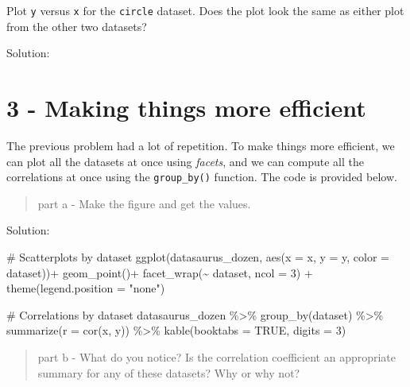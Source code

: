 \documentclass[
  letterpaper,
  DIV=11,
  numbers=noendperiod]{scrartcl}
\newenvironment{Shaded}{\begin{snugshade}}{\end{snugshade}}
\newcommand{\AttributeTok}[1]{\textcolor[rgb]{0.40,0.45,0.13}{#1}}
\newcommand{\CommentTok}[1]{\textcolor[rgb]{0.37,0.37,0.37}{#1}}
\newcommand{\ConstantTok}[1]{\textcolor[rgb]{0.56,0.35,0.01}{#1}}
\newcommand{\DecValTok}[1]{\textcolor[rgb]{0.68,0.00,0.00}{#1}}
\newcommand{\FunctionTok}[1]{\textcolor[rgb]{0.28,0.35,0.67}{#1}}
\newcommand{\NormalTok}[1]{\textcolor[rgb]{0.00,0.23,0.31}{#1}}
\newcommand{\SpecialCharTok}[1]{\textcolor[rgb]{0.37,0.37,0.37}{#1}}
\newcommand{\StringTok}[1]{\textcolor[rgb]{0.13,0.47,0.30}{#1}}
\begin{document}
Plot \texttt{y} versus \texttt{x} for the \texttt{circle} dataset. Does
the plot look the same as either plot from the other two datasets?

Solution:

\newpage

\hypertarget{making-things-more-efficient}{%
\section{3 - Making things more
efficient}\label{making-things-more-efficient}}

The previous problem had a lot of repetition. To make things more
efficient, we can plot all the datasets at once using \emph{facets}, and
we can compute all the correlations at once using the
\texttt{group\_by()} function. The code is provided below.

\begin{quote}
part a - Make the figure and get the values.
\end{quote}

Solution:

\begin{Shaded}
\begin{Highlighting}[]
\CommentTok{\# Scatterplots by dataset}
\FunctionTok{ggplot}\NormalTok{(datasaurus\_dozen, }\FunctionTok{aes}\NormalTok{(}\AttributeTok{x =}\NormalTok{ x, }\AttributeTok{y =}\NormalTok{ y, }\AttributeTok{color =}\NormalTok{ dataset))}\SpecialCharTok{+}
  \FunctionTok{geom\_point}\NormalTok{()}\SpecialCharTok{+}
  \FunctionTok{facet\_wrap}\NormalTok{(}\SpecialCharTok{\textasciitilde{}}\NormalTok{ dataset, }\AttributeTok{ncol =} \DecValTok{3}\NormalTok{) }\SpecialCharTok{+}
  \FunctionTok{theme}\NormalTok{(}\AttributeTok{legend.position =} \StringTok{"none"}\NormalTok{)}

\CommentTok{\# Correlations by dataset}
\NormalTok{datasaurus\_dozen }\SpecialCharTok{\%\textgreater{}\%}
  \FunctionTok{group\_by}\NormalTok{(dataset) }\SpecialCharTok{\%\textgreater{}\%}
  \FunctionTok{summarize}\NormalTok{(}\AttributeTok{r =} \FunctionTok{cor}\NormalTok{(x, y)) }\SpecialCharTok{\%\textgreater{}\%}
  \FunctionTok{kable}\NormalTok{(}\AttributeTok{booktabs =} \ConstantTok{TRUE}\NormalTok{, }\AttributeTok{digits =} \DecValTok{3}\NormalTok{)}
\end{Highlighting}
\end{Shaded}

\begin{quote}
part b - What do you notice? Is the correlation coefficient an
appropriate summary for any of these datasets? Why or why not?
\end{quote}
\end{document}
